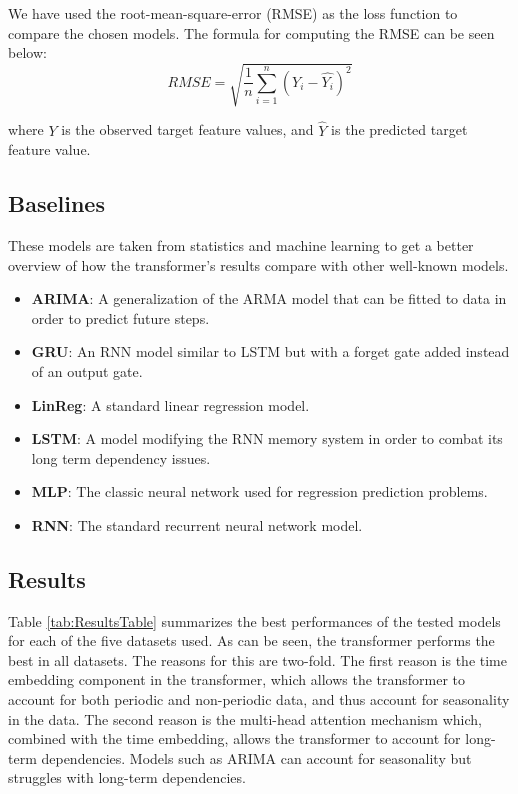 We have used the root-mean-square-error (RMSE) as the loss function to compare the chosen models.
The formula for computing the RMSE can be seen below: 
$$RMSE = \sqrt{\frac 1 n \displaystyle\sum_{i=1}^n(Y_i - \hat{Y_i})^2}$$

where $Y$ is the observed target feature values, and $\hat{Y}$ is the predicted target feature value.

\subsection{Baselines}

These models are taken from statistics and machine learning to get a better overview of how the transformer's results compare with other well-known models.
\begin{itemize}
    \item \textbf{ARIMA}\cite{ARIMA-book}: A generalization of the ARMA model that can be fitted to data in order to predict future steps.
    \item \textbf{GRU}\cite{GRU-paper}: An RNN model similar to LSTM but with a forget gate added instead of an output gate.
    \item \textbf{LinReg}: A standard linear regression model.
    \item \textbf{LSTM}\cite{LSTMPaper}: A model modifying the RNN memory system in order to combat its long term dependency issues.
    \item \textbf{MLP}\cite{MLP-paper}: The classic neural network used for regression prediction problems.
    \item \textbf{RNN}\cite{RNN-paper}: The standard recurrent neural network model.
\end{itemize}

\subsection{Results}\label{sec:results}
Table \ref{tab:ResultsTable} summarizes the best performances of the tested models for each of the five datasets used. 
As can be seen, the transformer performs the best in all datasets. The reasons for this are two-fold. 
The first reason is the time embedding component in the transformer, which allows the transformer to account for both periodic and non-periodic data, and thus account for seasonality in the data. 
The second reason is the multi-head attention mechanism which, combined with the time embedding, allows the transformer to account for long-term dependencies. Models such as ARIMA can account for seasonality but struggles with long-term dependencies. 

